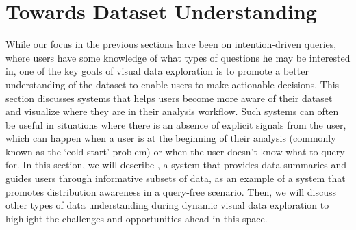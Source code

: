 \section{Towards Dataset Understanding\label{sec:understanding}}
\par While our focus in the previous sections have been on intention-driven queries, where users have some knowledge of what types of questions he may be interested in, one of the key goals of visual data exploration is to promote a better understanding of the dataset to enable users to make actionable decisions. This section discusses systems that helps users become more aware of their dataset and visualize where they are in their analysis workflow. Such systems can often be useful in situations where there is an absence of explicit signals from the user, which can happen when a user is at the beginning of their analysis (commonly known as the `cold-start' problem) or when the user doesn't know what to query for. In this section, we will describe \sbd, a system that provides data summaries and guides users through informative subsets of data, as an example of a system that promotes distribution awareness in a query-free scenario. Then, we will discuss other types of data understanding during dynamic visual data exploration to highlight the challenges and opportunities ahead in this space.

